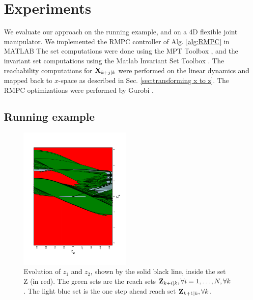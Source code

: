 \section{Experiments}
\label{sec:simulations}

We evaluate our approach on the running example, and on a 4D flexible joint manipulator.
We implemented the RMPC controller of Alg. \ref{alg:RMPC} in MATLAB
The set computations were done using the MPT Toolbox \cite{MPT3}, and the invariant set computations using the Matlab Invariant Set Toolbox \cite{IST}. 
The reachability computations for $\mathbf{X}_{k+j|k}$ were performed on the linear dynamics and mapped back to $x$-space as described in Sec. \ref{sec:transforming x to z}.
The RMPC optimizations were performed by Gurobi \cite{gurobi}.

\subsection{Running example}

\begin{figure}
\includegraphics[angle=270,width=0.49\textwidth]{figs/z_trajectory_new_2.pdf}
\caption{Evolution of $z_1$ and $z_2$, shown by the solid black line, inside the set Z (in red). The green sets are the reach sets $\mathbf{Z}_{k+i|k},\forall i=1,\dotsc,N, \forall k$. The light blue set is the one step ahead reach set $\mathbf{Z}_{k+1|k},\forall k$.}
\label{fig:z_new_toy}
\end{figure}

